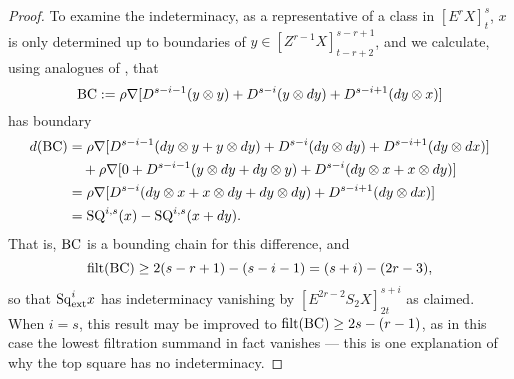 \documentclass[11pt]{amsart}
\theoremstyle{plain}
\theoremstyle{definition}
\theoremstyle{plain}
\newcommand{\Nabla}{\nabla}
\newcommand{\Sq}{\mathrm{Sq}}
\newcommand{\E}[5]{[E^{#1}_{#2}#3]^{#4}_{#5}}
\newcommand{\EZ}[5]{[Z^{#1}_{#2}#3]^{#4}_{#5}}
\newcommand{\filt}{\textup{filt}}
\begin{document}
\begin{second quadrant homotopy}
\begin{proof}
To examine the indeterminacy, as a representative of a class in $\E{r}{}{X}{s}{t}$,  $x$ is only determined up to boundaries of $y\in \EZ{r-1}{}{X}{s-r+1}{t-r+2}  $, and we calculate, using analogues of \cite[(1.111),(1.112)]{MR2245560}, that
\[\textup{BC}:=\rho\Nabla [D^{s-i-1}(y\otimes y)+D^{s-i}(y\otimes dy)+D^{s-i+1}(dy\otimes x)]\]
has boundary
\begin{alignat*}{2}
d(\textup{BC})
&=
\rho\Nabla [D^{s-i-1}(dy\otimes y+y\otimes dy)+D^{s-i}(dy\otimes dy)+D^{s-i+1}(dy\otimes dx)]%
\\
&\ \ \ +
\rho\Nabla [0+D^{s-i-1}(y\otimes dy+dy\otimes y)+D^{s-i}(dy\otimes x+x\otimes dy)]%
\\
&=
\rho\Nabla [D^{s-i}(dy\otimes x+x\otimes dy+dy\otimes dy)
+D^{s-i+1}(dy\otimes dx)]\\
&=\textup{SQ}^{i,s}(x)-\textup{SQ}^{i,s}(x+dy).%
\end{alignat*} 
That is, $\textup{BC}$ is a bounding chain for this difference, and
\[\filt(\textup{BC})\geq 2(s-r+1)-(s-i-1)=(s+i)-(2r-3),\]
so that $\Sq^i_\textup{ext}x$ has indeterminacy vanishing by $\E{2r-2}{}{S_2X}{s+i}{2t}$ as claimed. When $i=s$, this result may be improved to $\filt(\textup{BC})\geq 2s-(r-1)$,  as in this case the lowest filtration summand in fact vanishes --- this is one explanation of why the top square has no indeterminacy.


\end{proof}
\end{second quadrant homotopy}
\end{document}
